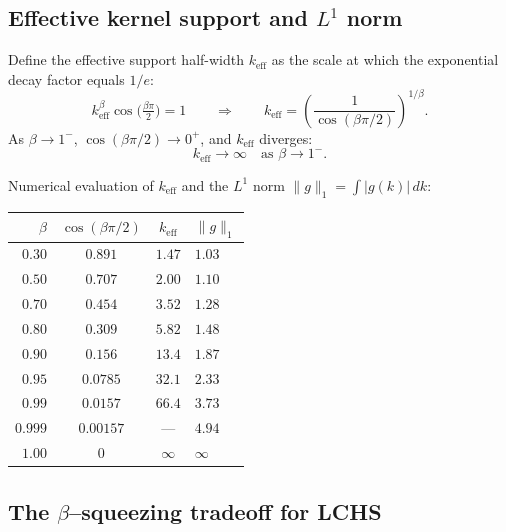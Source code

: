 \documentclass[11pt]{article}
\begin{document}
\subsection{Effective kernel support and $L^1$ norm}

Define the effective support half-width $k_{\mathrm{eff}}$ as the scale
at which the exponential decay factor equals $1/e$:
\begin{equation}\label{eq:keff}
  k_{\mathrm{eff}}^\beta \cos\!\bigl(\tfrac{\beta\pi}{2}\bigr) = 1
  \qquad\Longrightarrow\qquad
  k_{\mathrm{eff}} = \left(\frac{1}{\cos(\beta\pi/2)}\right)^{1/\beta}.
\end{equation}
As $\beta \to 1^-$, $\cos(\beta\pi/2) \to 0^+$, and $k_{\mathrm{eff}}$
diverges:
\begin{equation}\label{eq:keff-diverge}
  k_{\mathrm{eff}} \to \infty \quad \text{as } \beta \to 1^-.
\end{equation}

Numerical evaluation of $k_{\mathrm{eff}}$ and the $L^1$ norm
$\|g\|_1 = \int |g(k)|\,dk$:

\begin{center}
\begin{tabular}{rccl}
  \toprule
  $\beta$ & $\cos(\beta\pi/2)$ & $k_{\mathrm{eff}}$ & $\|g\|_1$ \\
  \midrule
  $0.30$ & $0.891$ & $1.47$ & $1.03$ \\
  $0.50$ & $0.707$ & $2.00$ & $1.10$ \\
  $0.70$ & $0.454$ & $3.52$ & $1.28$ \\
  $0.80$ & $0.309$ & $5.82$ & $1.48$ \\
  $0.90$ & $0.156$ & $13.4$ & $1.87$ \\
  $0.95$ & $0.0785$ & $32.1$ & $2.33$ \\
  $0.99$ & $0.0157$ & $66.4$ & $3.73$ \\
  $0.999$ & $0.00157$ & --- & $4.94$ \\
  $1.00$ & $0$ & $\infty$ & $\infty$ \\
  \bottomrule
\end{tabular}
\end{center}

\subsection{The $\beta$--squeezing tradeoff for LCHS}
\end{document}
